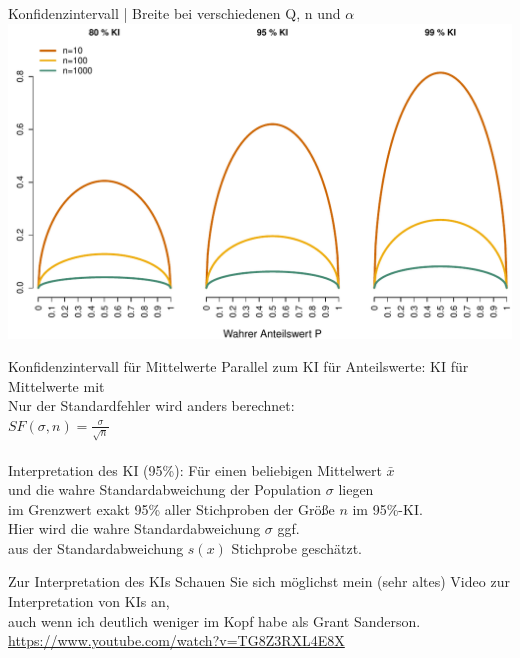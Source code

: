 \begin{frame}
  {Konfidenzintervall | Breite bei verschiedenen Q, n und $\alpha$}
  \centering 
  \includegraphics[height=0.85\textheight]{RVorlesung/threecis}
\end{frame}

\begin{frame}
  {Konfidenzintervall für Mittelwerte}
  \onslide<+->
  \onslide<+->
  Parallel zum KI für Anteilswerte: \alert{KI für Mittelwerte} mit \\
  \Doppelzeile
  \onslide<+->
  \centering 
  Nur der Standardfehler wird anders berechnet:\\
  \Zeile
  \alert{$SF(\sigma, n)=\frac{\sigma}{\sqrt{n}}$}\\
  \Halbzeile
  \\
  \onslide<+->
  \Doppelzeile
  Interpretation des KI (95\%): Für einen \alert{beliebigen Mittelwert $\bar{x}$}\\
  und die \alert{wahre Standardabweichung der Population $\sigma$} liegen\\
  im Grenzwert exakt \alert{95\% aller Stichproben der Größe $n$ im 95\%-KI}.\\
  \Zeile
  Hier wird die wahre Standardabweichung $\sigma$ ggf.\\
  aus der Standardabweichung $s(x)$ Stichprobe geschätzt.
\end{frame}

\begin{frame}
  {Zur Interpretation des KIs}
  \onslide<+->
  \onslide<+->
  \centering 
  Schauen Sie sich möglichst mein (sehr altes) Video zur Interpretation von KIs an,\\
  auch wenn ich deutlich weniger im Kopf habe als Grant Sanderson.\\
  \Zeile
  \url{https://www.youtube.com/watch?v=TG8Z3RXL4E8X}
\end{frame}


